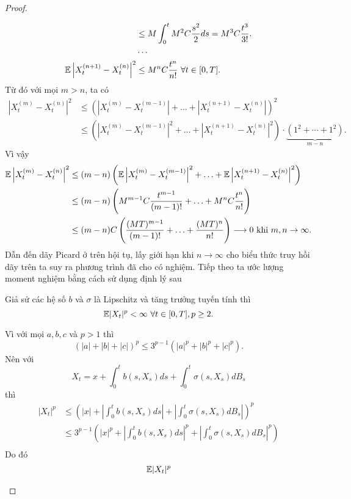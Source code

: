 \begin{proof}
\begin{enumerate}
\begin{align*}
        &\leq M\int_0^t{M^2C\dfrac{s^2}{2}ds} = M^3C\dfrac{t^3}{3!}.\\
        &\cdots\\
        \mathbb{E}\left|X_t^{(n+1)}-X_t^{(n)}\right|^2 
        &\leq M^nC\dfrac{t^n}{n!} ~\forall t \in [0,T].
    \end{align*}
    Từ đó với mọi $m>n$, ta có
    \begin{align*}
        \left|X_t^{(m)}-X_t^{(n)}\right|^2
        &\leq \left(\left|X_t^{(m)}-X_t^{(m-1)}\right| + \ldots + \left|X_t^{(n+1)}-X_t^{(n)}\right|\right)^2\\
        &\leq \left(\left|X_t^{(m)}-X_t^{(m-1)}\right|^2  + \ldots + \left|X_t^{(n+1)}-X_t^{(n)}\right|^2\right) \cdot \underbrace{(1^2+\cdots+1^2)}_{m-n}.
    \end{align*}
    Vì vậy 
    \begin{align*}
        \mathbb{E}\left|X_t^{(m)}-X_t^{(n)}\right|^2
        &\leq (m-n)\left(\mathbb{E}\left|X_t^{(m)}-X_t^{(m-1)}\right|^2  + \ldots + \mathbb{E}\left|X_t^{(n+1)}-X_t^{(n)}\right|^2\right) \\
        &\leq (m-n) \left(M^{m-1}C\dfrac{t^{m-1}}{(m-1)!}+\ldots+M^nC\dfrac{t^n}{n!}\right)\\
        &\leq (m-n)C \left(\dfrac{(MT)^{m-1}}{(m-1)!}+\ldots+\dfrac{(MT)^n}{n!}\right) \longrightarrow 0 \text{ khi } m,n \to \infty.
    \end{align*}
    Dẫn đến dãy Picard ở trên hội tụ, lấy giới hạn khi $n \to \infty$ cho biểu thức truy hồi dãy trên ta suy ra phương trình đã cho có nghiệm.
    Tiếp theo ta ước lượng moment nghiệm bằng cách sử dụng định lý sau
    \begin{thm}
        Giả sử các hệ số $b$ và $\sigma$ là Lipschitz và tăng trưởng tuyến tính thì 
        \[\mathbb{E}|X_t|^p < \infty ~\forall t \in [0,T], p \geq 2.\]
    \end{thm}
    Vì với mọi $a,b,c$ và $p>1$ thì \[(|a|+|b|+|c|)^p \leq 3^{p-1}(|a|^p+|b|^p+|c|^p).\]
    Nên với \[X_t = x+\int_0^t{b(s,X_s)ds}+\int_0^t{\sigma(s,X_s)dB_s}\]
    thì 
    \begin{align*}
        |X_t|^p &\leq \left(|x|+\left|\int_0^t{b(s,X_s)ds}\right|+\left|\int_0^t{\sigma(s,X_s)dB_s}\right|\right)^p\\
        &\leq 3^{p-1}\left(|x|^p+\left|\int_0^t{b(s,X_s)ds}\right|^p+\left|\int_0^t{\sigma(s,X_s)dB_s}\right|^p\right)\\
    \end{align*}
    Do đó 
    \begin{align*}
        \E|X_t|^p

\end{align*}
\end{enumerate}
\end{proof}
